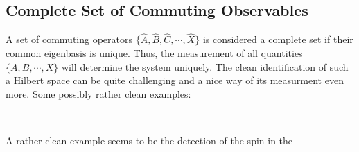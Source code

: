 \subsection{Complete Set of Commuting Observables}

A set of commuting operators $\{\hat{A},\hat{B},\hat{C},\cdots,\hat{X}\}$ is considered a complete set if their common eigenbasis is 				unique. Thus, the measurement of all quantities $\{A,B,\cdots,X\}$ will determine the system uniquely. The clean identification of such a Hilbert space can be quite challenging and a nice way of its measurment even more. Some possibly rather clean examples:

\

A rather clean example seems to be the detection of the spin in the 